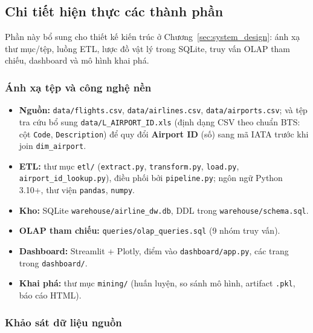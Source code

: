 \subsection{Chi tiết hiện thực các thành phần}
\label{subsec:implementation_components}

Phần này bổ sung cho thiết kế kiến trúc ở Chương~\ref{sec:system_design}: ánh xạ thư mục/tệp,
luồng ETL, lược đồ vật lý trong SQLite, truy vấn OLAP tham chiếu, dashboard và mô hình khai phá.

\subsubsection{Ánh xạ tệp và công nghệ nền}

\begin{itemize}
  \item \textbf{Nguồn:} \texttt{data/flights.csv}, \texttt{data/airlines.csv}, \texttt{data/airports.csv};
        và tệp tra cứu bổ sung \texttt{data/L\_AIRPORT\_ID.xls} (định dạng CSV theo chuẩn BTS: cột \texttt{Code}, \texttt{Description})
        để quy đổi \textbf{Airport ID} (số) sang mã IATA trước khi join \texttt{dim\_airport}.
  \item \textbf{ETL:} thư mục \texttt{etl/} (\texttt{extract.py}, \texttt{transform.py}, \texttt{load.py}, \texttt{airport\_id\_lookup.py}),
        điều phối bởi \texttt{pipeline.py}; ngôn ngữ Python 3.10+, thư viện \texttt{pandas}, \texttt{numpy}.
  \item \textbf{Kho:} SQLite \texttt{warehouse/airline\_dw.db}, DDL trong \texttt{warehouse/schema.sql}.
  \item \textbf{OLAP tham chiếu:} \texttt{queries/olap\_queries.sql} (9 nhóm truy vấn).
  \item \textbf{Dashboard:} Streamlit + Plotly, điểm vào \texttt{dashboard/app.py}, các trang trong \texttt{dashboard/}.
  \item \textbf{Khai phá:} thư mục \texttt{mining/} (huấn luyện, so sánh mô hình, artifact \texttt{.pkl}, báo cáo HTML).
\end{itemize}

\subsubsection{Khảo sát dữ liệu nguồn}
\label{subsubsec:eda_source_impl}

